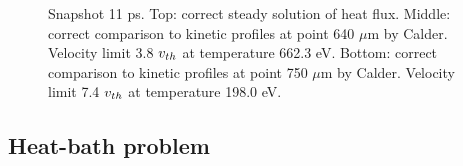 \begin{figure}[tbh]
\begin{center}
\begin{tabular}{c}
    \end{tabular}
  \caption{  
  Snapshot 11 ps. Top: correct steady solution of heat flux.  
  Middle: correct comparison to kinetic profiles at point 640 $\mu$m by Calder. 
  Velocity limit 3.8 $v_{th}$ at temperature 662.3 eV.
  Bottom: correct comparison to kinetic profiles at point 750 $\mu$m by Calder.
  Velocity limit 7.4 $v_{th}$ at temperature 198.0 eV.
  }
  \label{fig:C7_Calder_case1}
  \end{center} 
\end{figure}

\subsection{Heat-bath problem}  
\label{sec:heatbath_test}

